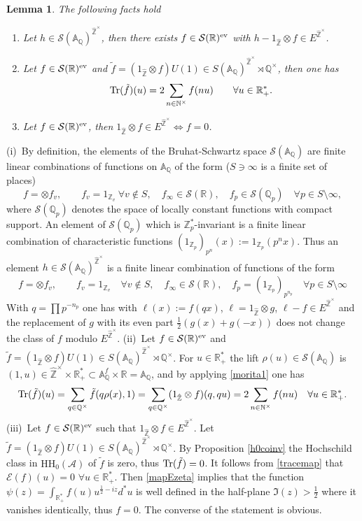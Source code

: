 \documentclass{pspum-l}
\newtheorem{lemma}[theorem]{Lemma}
\theoremstyle{definition}
\theoremstyle{remark}
\numberwithin{equation}{section}
\def\A{{\mathbb A}}
\def\Q{{\mathbb Q}}
\def\R{{\mathbb R}}
\def\Z{{\mathbb Z}}
\def\cA{{\mathcal A}}
\def\cE{{\mathcal E}}
\def\cS{{\mathcal S}}
\def\tr{{\rm Tr}}
\def\sarr{{\cS(\A_\Q)}}
\def\hatz{{\hat\Z^\times}}
\def\nt{\N^{\times}}
\def\N{{\mathbb N}}
\def\HH{\text{HH}}
\begin{document}
\begin{lemma}\label{propmapE}  
The following facts hold\begin{enumerate}
    \item[(i)] Let $h\in\cS(\A_\Q)^{\hatz}$, then there exists $ f\in \cS(\R)^{\rm ev}$ with $h-1_{\hat \Z}\otimes f\in E^{\hatz}$.
\item[(ii)] Let $ f\in \cS(\R)^{\rm ev}$ and $\tilde f=(1_{\hat \Z}\otimes f)U(1)\in S(\A_\Q)^{\hatz}\rtimes \Q^\times$, then one has 
\begin{equation}\label{tracemap}
\tr(\tilde f)(u)=2\sum_{n\in \nt} f(nu)\qquad \forall u\in \R_+^*.
\end{equation}
\item[(iii)] Let $ f\in \cS(\R)^{\rm ev}$, then $1_{\hat \Z}\otimes f\in E^{\hatz}\iff f=0$.
\end{enumerate}
 \end{lemma} 
\proof (i)~By definition, the elements of the Bruhat-Schwartz space $\sarr$  are finite linear combinations of functions on $\A_\Q$ of the form  ($S\ni \infty$ is a finite set of places)
\[
f=\otimes f_v, \qquad f_v=1_{\Z_v}~  \forall v \notin S, \quad  f_{\infty}\in \cS(\R), \quad f_p\in \cS(\Q_p)\quad \forall p\in S\setminus \infty,
\]
where $\cS(\Q_p)$ denotes the space of locally constant functions with compact support. An element of 
$\cS(\Q_p)$ which is $\Z_p^*$-invariant is a finite linear combination of  characteristic functions $(1_{\Z_p})_{p^n}(x):=1_{\Z_p}(p^n x)$. Thus an element  $h\in \cS(\A_\Q)^{\hatz}$ is   a finite linear combination of functions of the form
\[
f=\otimes f_v, \qquad f_v=1_{\Z_v}\quad \forall v \notin S, \quad  f_{\infty}\in \cS(\R), \quad f_p=(1_{\Z_p})_{p^{n_p}}\quad \forall p\in S\setminus \infty
\]
With $q=\prod p^{-n_p}$ one has with $\ell(x):=f(qx)$,  $\ell=1_{\hat \Z}\otimes g$, $\ell -f\in E^{\hatz}$ and the replacement of $g$ with its even part $\frac 12 (g(x)+g(-x))$ does not change the class of $f$ modulo $E^{\hatz}$.\newline
(ii)~Let $f\in \cS(\R)^{\rm ev}$ and $\tilde f=(1_{\hat \Z}\otimes f)U(1)\in S(\A_\Q)^{\hatz}\rtimes \Q^\times$. For $u\in \R_+^*$ the lift $\rho(u)\in \cS(\A_\Q)$ is  $(1, u)\in \hatz\times \R_+^*\subset \A_\Q^f\times \R =\A_\Q$, and by applying \eqref{morita1} one has
\begin{equation}\label{trmap}
\tr(\tilde f)(u)=\sum_{q\in \Q^\times} \tilde f(q \rho(x),1)=
\sum_{q\in \Q^\times} (1_{\hat \Z}\otimes f)(q,qu)=2\sum_{n\in \nt} f(nu)\quad \forall u\in \R_+^*.
\end{equation}
(iii)~Let $ f\in \cS(\R)^{\rm ev}$ such that $1_{\hat \Z}\otimes f\in E^{\hatz}$. Let $\tilde f=(1_{\hat \Z}\otimes f)U(1)\in S(\A_\Q)^{\hatz}\rtimes \Q^\times$. By Proposition \ref{h0coinv} the Hochschild class in $\HH_0(\cA)$ of  $\tilde f$ is zero, thus $\tr(\tilde f)=0$. It follows from \eqref{tracemap}  
that $\cE(f)(u)=0$ $\forall u\in \R_+^*$. Then \eqref{mapEzeta} implies that the function $\psi(z)=\int_{\R_+^*}f(u)u^{\frac 12-iz}d^*u$ is well defined in the half-plane $\Im(z)  >\frac 12$ where it vanishes identically, thus $f=0$. The converse of the statement is obvious.
\endproof 
\end{document}
